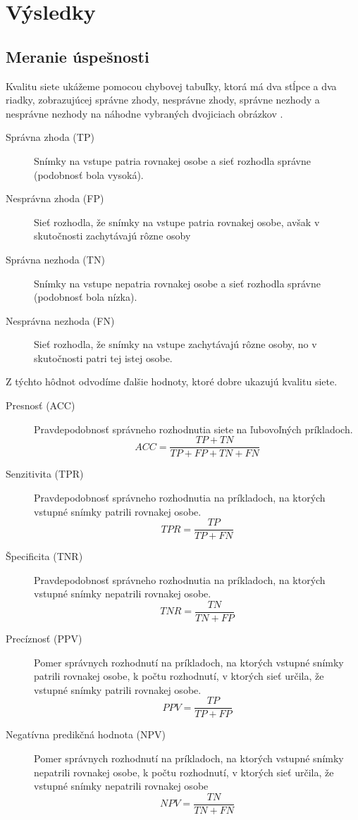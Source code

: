 \section{Výsledky}

\subsection{Meranie úspešnosti}
Kvalitu siete ukážeme pomocou chybovej tabuľky, ktorá má dva stĺpce a dva riadky, zobrazujúcej
správne zhody, nesprávne zhody, správne nezhody a nesprávne nezhody na náhodne vybraných dvojiciach obrázkov \cite{roc}.

\begin{description}
\item[Správna zhoda (TP)]
Snímky na vstupe patria rovnakej osobe a sieť rozhodla správne (podobnosť bola vysoká).

\item[Nesprávna zhoda (FP)]
Sieť rozhodla, že snímky na vstupe patria rovnakej osobe, avšak v skutočnosti zachytávajú rôzne osoby

\item[Správna nezhoda (TN)]
Snímky na vstupe nepatria rovnakej osobe a sieť rozhodla správne (podobnosť bola nízka).

\item[Nesprávna nezhoda (FN)]
Sieť rozhodla, že snímky na vstupe zachytávajú rôzne osoby, no v skutočnosti patri tej istej osobe.
\end{description}

Z týchto hôdnot odvodíme ďalšie hodnoty, ktoré dobre ukazujú kvalitu siete.

\begin{description}
\item[Presnosť (ACC)] Pravdepodobnosť správneho rozhodnutia siete na ľubovoľných príkladoch.
$$ACC = \frac{TP + TN}{TP + FP + TN + FN}$$
\item[Senzitivita (TPR)] Pravdepodobnosť správneho rozhodnutia na príkladoch, na ktorých vstupné snímky patrili rovnakej osobe.
$$TPR = \frac{TP}{TP + FN}$$
\item[Špecificita (TNR)] Pravdepodobnosť správneho rozhodnutia na príkladoch, na ktorých vstupné snímky nepatrili rovnakej osobe.
$$TNR = \frac{TN}{TN + FP}$$
\item[Precíznosť (PPV)] Pomer správnych rozhodnutí na príkladoch, na ktorých vstupné snímky patrili rovnakej osobe, k počtu rozhodnutí, v ktorých sieť určila, že vstupné snímky patrili rovnakej osobe.
$$PPV = \frac{TP}{TP + FP}$$
\item[Negatívna predikčná hodnota (NPV)] Pomer správnych rozhodnutí na príkladoch, na ktorých vstupné snímky nepatrili rovnakej osobe, k počtu rozhodnutí, v ktorých sieť určila, že vstupné snímky nepatrili rovnakej osobe
$$NPV = \frac{TN}{TN + FN}$$
\end{description}

